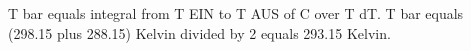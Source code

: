 T bar equals integral from T EIN to T AUS of C over T dT.  
T bar equals (298.15 plus 288.15) Kelvin divided by 2 equals 293.15 Kelvin.